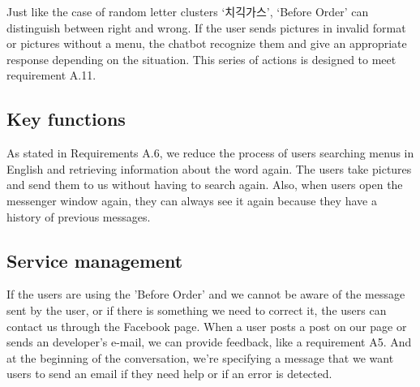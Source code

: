 Just like the case of random letter clusters ‘치긱가스’, ‘Before Order’ can distinguish between right and wrong. If the user sends pictures in invalid format or pictures without a menu, the chatbot recognize them and give an appropriate response depending on the situation. This series of actions is designed to meet requirement A.11.


\subsection{Key functions}
As stated in Requirements A.6, we reduce the process of users searching menus in English and retrieving information about the word again. The users take pictures and send them to us without having to search again. Also, when users open the messenger window again, they can always see it again because they have a history of previous messages.

\subsection{Service management}
If the users are using the 'Before Order' and we cannot be aware of the message sent by the user, or if there is something we need to correct it, the users can contact us through the Facebook page. When a user posts a post on our page or sends an developer’s e-mail, we can provide feedback, like a requirement A5. And at the beginning of the conversation, we're specifying a message that we want users to send an email if they need help or if an error is detected.\newline\newline











